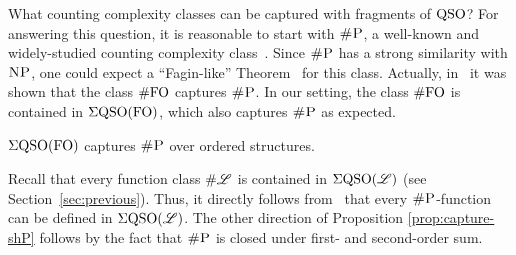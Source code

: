What counting complexity classes can be captured with fragments of ${\rm QSO}$?
For answering this question, it is reasonable to start with $\text{\sc \#P}$, a well-known and widely-studied counting complexity class~\cite{arora2009computational}. 
Since $\text{\sc \#P}$ has a strong similarity with $\text{\sc NP}$, one could expect a ``Fagin-like'' Theorem~\cite{fagin1974generalized} for this class. 
Actually, in~\cite{SalujaST95} it was shown that the class $\#{\rm FO}$ captures $\text{\sc \#P}$.
In our setting, the class $\#{\rm FO}$ is contained in $\Sigma{\rm QSO}({\rm FO})$, which also captures $\text{\sc \#P}$ as expected. 
\begin{proposition} \label{prop:capture-shP}
	$\Sigma{\rm QSO}({\rm FO})$ captures $\text{\sc \#P}$ over ordered structures.
\end{proposition}
Recall  that every function class $\# \mathscr{L}$ is contained in $\Sigma{\rm QSO}(\mathscr{L})$ (see Section~\ref{sec:previous}). Thus, it directly follows from~\cite{SalujaST95}  that every $\text{\sc \#P}$-function can be defined in $\Sigma{\rm QSO}(\mathscr{L})$. The other direction of Proposition \ref{prop:capture-shP} follows by the fact that $\text{\sc \#P}$ is closed under first- and second-order sum.

